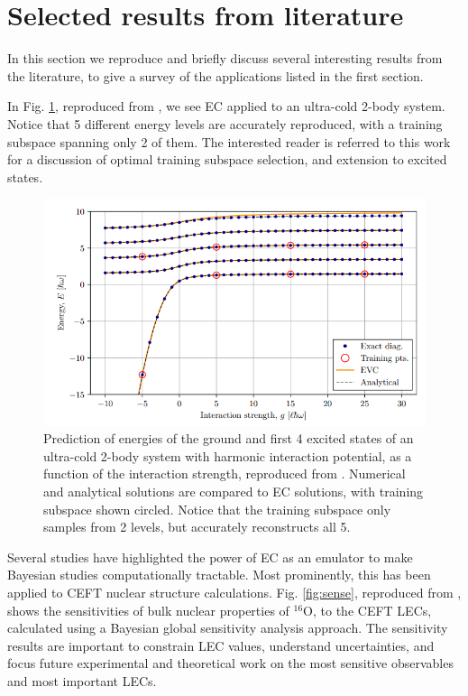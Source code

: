 \documentclass[%
 reprint,
 amsmath,amssymb,
 aps,
]{revtex4-2}
\begin{document}
\section{\label{sec:lim} Selected results from literature}

In this section we reproduce and briefly discuss several interesting results from the literature, to give a survey of the applications listed in the first section.

In Fig. \ref{fig:exc}, reproduced from \cite{eklind2021eigenvector}, we see \ac{EC} applied to an ultra-cold 2-body system. Notice that 5 different energy levels are accurately reproduced, with a training subspace spanning only 2 of them. The interested reader is referred to this work for a discussion of optimal training subspace selection, and extension to excited states.

\begin{figure}[htpb]
  \centering
  \includegraphics[width=0.99\linewidth]{./EC_vs_anal_excited.png}
  \caption{Prediction of energies of the ground and first 4 excited states of an ultra-cold 2-body system with harmonic interaction potential, as a function of the interaction strength, reproduced from \cite{eklind2021eigenvector}. Numerical and analytical solutions are compared to \ac{EC} solutions, with training subspace shown circled. Notice that the training subspace only samples from 2 levels, but accurately reconstructs all 5.}%
  \label{fig:exc}
\end{figure}

Several studies have highlighted the power of \ac{EC} as an emulator to make Bayesian studies computationally tractable. Most prominently, this has been applied to \ac{CEFT} nuclear structure calculations. Fig. \ref{fig:sense}, reproduced from \cite{ekstrom2019global}, shows the sensitivities of bulk nuclear properties of $^{16}$O, to the \ac{CEFT} \ac{LEC}s, calculated using a Bayesian global sensitivity analysis approach.  The sensitivity results are important to constrain LEC values, understand uncertainties, and focus  future experimental and theoretical work on the most sensitive observables and most
important LECs. 
\end{document}
